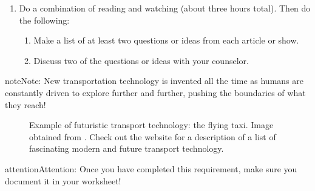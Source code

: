\documentclass[letterpaper,10pt,english,openany,oneside]{sphinxmanual}
\let\sphinxpxdimen\pdfpxdimen\else\newdimen\sphinxpxdimen
\begin{document}
\begin{enumerate}
\item {} 
Do a combination of reading and watching (about three hours total). Then do the following:
\begin{enumerate}
%
\item {} 
Make a list of at least two questions or ideas from each article or show.

\item {} 
Discuss two of the questions or ideas with your counselor.

\end{enumerate}

\end{enumerate}

\begin{sphinxadmonition}{note}{Note:}
New transportation technology is invented all the time as humans are constantly driven to explore further and further, pushing the boundaries of what they reach!

\begin{figure}[H]
\centering
\capstart

\noindent\sphinxincludegraphics[width=400\sphinxpxdimen]{{FlyingTaxi}.png}
\caption{Example of futuristic transport technology: the flying taxi. Image obtained from . Check out the website for a description of a list of fascinating modern and future transport technology.}\label{\detokenize{requirement1:id1}}\end{figure}
\end{sphinxadmonition}

\begin{sphinxadmonition}{attention}{Attention:}
Once you have completed this requirement, make sure you document it in your worksheet!
\end{sphinxadmonition}
\end{document}
